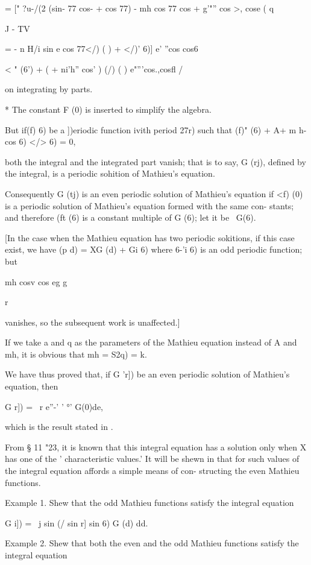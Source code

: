= [" ?u-/(2 (sin- 77 cos- + cos 77) - mh cos 77 cos + g'"'' cos >,
cose ( q

J - TV

= - n H/i sin e cos 77</) ( ) + </)' 6)] e' ''cos cos6

 < " (6') + ( + ni'h'' cos' ) (/) ( ) e"'''cos.,cosfl /

on integrating by parts.

* The constant F (0) is inserted to simplify the algebra.

%
%

But if(f) 6) be a ])eriodic function ivith period 27r) such that (f)"
(6) + A+ m h- cos 6) </> 6) = 0,

both the integral and the integrated part vanish; that is to say, G
(rj), defined by the integral, is a periodic sohition of Mathieu's
equation.

Consequently G (tj) is an even periodic solution of Mathieu's equation
if <f) (0) is a periodic solution of Mathieu's equation formed with
the same con- stants; and therefore (ft (6) is a constant multiple of
G (6); let it be \ G(6).

[In the case when the Mathieu equation has two periodic sokitions, if
this case exist, we have (p d) = XG (d) + Gi 6) where 6-'i 6) is an
odd periodic function; but

 mh cosv cos eg g

r

vanishes, so the subsequent work is unaffected.]

If we take a and q as the parameters of the Mathieu equation instead
of A and mh, it is obvious that mh = \/ S2q) = k.

We have thus proved that, if G 'r]) be an even periodic solution of
Mathieu's equation, then

G r]) = \ r e''-' ' °' G(0)de,

which is the result stated in .

From § 11 "23, it is known that this integral equation has a solution
only when X has one of the ' characteristic values.' It will be shewn
in  that for such values of \, the integral equation affords a
simple means of con- structing the even Mathieu functions.

Example 1. Shew that the odd Mathieu functions satisfy the integral
equation

G i]) = \ j sin (/ sin r] sin 6) G (d) dd.

Example 2. Shew that both the even and the odd Mathieu functions
satisfy the integral equation

